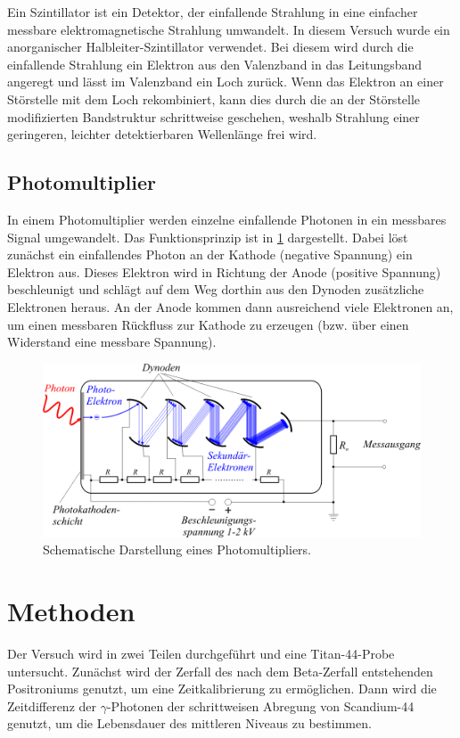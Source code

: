 \documentclass[
	a4paper,
	12pt,
	pagesize,
	ngerman
]{scrartcl}
\begin{document}
	Ein Szintillator ist ein Detektor, der einfallende Strahlung in eine einfacher messbare elektromagnetische Strahlung umwandelt.
	In diesem Versuch wurde ein anorganischer Halbleiter-Szintillator verwendet.
	Bei diesem wird durch die einfallende Strahlung ein Elektron aus den Valenzband in das Leitungsband angeregt und lässt im Valenzband ein Loch zurück.
	Wenn das Elektron an einer Störstelle mit dem Loch rekombiniert, kann dies durch die an der Störstelle modifizierten Bandstruktur schrittweise geschehen, weshalb Strahlung einer geringeren, leichter detektierbaren Wellenlänge frei wird.

	\subsection{Photomultiplier}

	In einem Photomultiplier werden einzelne einfallende Photonen in ein messbares Signal umgewandelt.
	Das Funktionsprinzip ist in \cref{fig_Photomultiplier} dargestellt.
	Dabei löst zunächst ein einfallendes Photon an der Kathode (negative Spannung) ein Elektron aus.
	Dieses Elektron wird in Richtung der Anode (positive Spannung) beschleunigt und schlägt auf dem Weg dorthin aus den Dynoden zusätzliche Elektronen heraus.
	An der Anode kommen dann ausreichend viele Elektronen an, um einen messbaren Rückfluss zur Kathode zu erzeugen (bzw. über einen Widerstand eine messbare Spannung).

	\begin{figure}[H]
			\includegraphics[width=0.6\linewidth]{img/Photomultiplier}
			\caption{
			Schematische Darstellung eines Photomultipliers.
			\cite{Photomultiplier}
			}
			\label{fig_Photomultiplier}
	\end{figure}

	\section{Methoden}
	Der Versuch wird in zwei Teilen durchgeführt und eine Titan-44-Probe untersucht.
	Zunächst wird der Zerfall des nach dem Beta-Zerfall entstehenden Positroniums genutzt, um eine Zeitkalibrierung zu ermöglichen.
	Dann wird die Zeitdifferenz der $\gamma$-Photonen der schrittweisen Abregung von Scandium-44 genutzt, um die Lebensdauer des mittleren Niveaus zu bestimmen.
\end{document}
